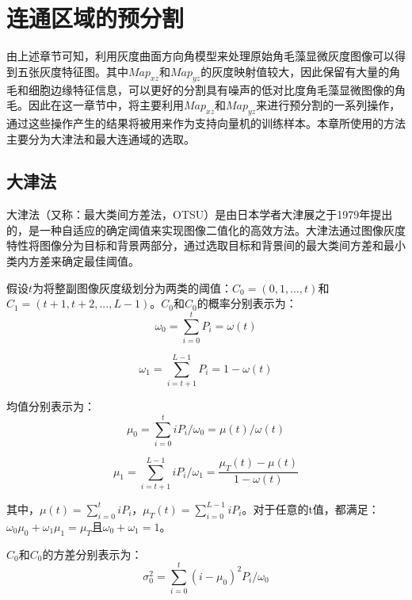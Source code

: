 
\chapter{连通区域的预分割}
由上述章节可知，利用灰度曲面方向角模型来处理原始角毛藻显微灰度图像可以得到五张灰度特征图。其中$Map_{xz}$和$Map_{yz}$的灰度映射值较大，因此保留有大量的角毛和细胞边缘特征信息，可以更好的分割具有噪声的低对比度角毛藻显微图像的角毛。因此在这一章节中，将主要利用$Map_{xz}$和$Map_{yz}$来进行预分割的一系列操作，通过这些操作产生的结果将被用来作为支持向量机的训练样本。本章所使用的方法主要分为大津法和最大连通域的选取。
\section{大津法}
大津法（又称：最大类间方差法，OTSU）是由日本学者大津展之\cite{otsu1975threshold}于1979年提出的，是一种自适应的确定阈值来实现图像二值化的高效方法。大津法通过图像灰度特性将图像分为目标和背景两部分，通过选取目标和背景间的最大类间方差和最小类内方差来确定最佳阈值。

假设$t$为将整副图像灰度级划分为两类的阈值：$C_{0}=(0,1,...,t)$和$C_{1}=(t+1,t+2,...,L-1)$。$C_{0}$和$C_{0}$的概率分别表示为：
\begin{equation}
\omega_{0}=\sum_{i=0}^{t}P_{i}=\omega(t)
\end{equation}

\begin{equation}
\omega_{1}=\sum_{i=t+1}^{L-1}P_{i}=1-\omega(t)
\end{equation}

均值分别表示为：
\begin{equation}
\mu_{0}=\sum_{i=0}^{t}iP_{i}/\omega_{0}=\mu(t)/\omega(t)
\end{equation}

\begin{equation}
\mu_{1}=\sum_{i=t+1}^{L-1}iP_{i}/\omega_{1}=\frac{\mu_{T}(t)-\mu(t)}{1-\omega(t)}
\end{equation}

其中，$\mu(t)=\sum_{i=0}^{t}iP_{i}$，$\mu_{T}(t)=\sum_{i=0}^{L-1}iP_{i}$。对于任意的t值，都满足：$\omega_{0}\mu_{0}+\omega_{1}\mu_{1}=\mu_{T}$且$\omega_{0}+\omega_{1}=1$。

$C_{0}$和$C_{0}$的方差分别表示为：
\begin{equation}
\sigma_{0}^{2}=\sum_{i=0}^{t}(i-\mu_{0})^2P_{i}/\omega_{0}
\end{equation}


